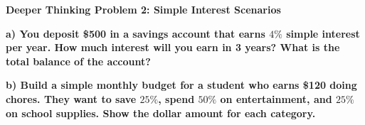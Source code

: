 \documentclass[12pt, letterpaper, fleqn]{article}
\begin{document}
\begin{tcolorbox}[colback=yellow!15, colframe=orange, boxrule=1.5pt, arc=4mm, left=6mm, right=6mm, top=5mm, bottom=5mm]
\textbf{Deeper Thinking Problem 2: Simple Interest Scenarios}

\medskip

\noindent
\textbf{a) You deposit \$500 in a savings account that earns $4\%$ simple interest per year. How much interest will you earn in 3 years? What is the total balance of the account?}

\vspace{2cm}

\noindent
\textbf{b) Build a simple monthly budget for a student who earns \$120 doing chores. They want to save $25\%$, spend $50\%$ on entertainment, and $25\%$ on school supplies. Show the dollar amount for each category.}

\vspace{2cm}
\end{tcolorbox}
\newpage
\end{document}

